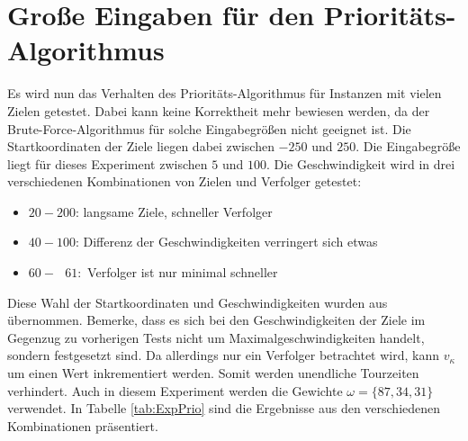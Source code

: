 \documentclass[german,version-2019-11]{uzl-thesis}
\begin{document}
\section{Große Eingaben für den Prioritäts-Algorithmus}
Es wird nun das Verhalten des Prioritäts-Algorithmus für Instanzen mit vielen Zielen getestet. Dabei kann keine Korrektheit mehr bewiesen werden, da der Brute-Force-Algorithmus für solche Eingabegrößen nicht geeignet ist. Die Startkoordinaten der Ziele liegen dabei zwischen $-250$ und $250$. Die Eingabegröße liegt für dieses Experiment zwischen $5$ und $100$. Die Geschwindigkeit wird in drei verschiedenen Kombinationen von Zielen und Verfolger getestet:
\begin{itemize}
\item $20-200$: langsame Ziele, schneller Verfolger
\item $40-100$: Differenz der Geschwindigkeiten verringert sich etwas
\item $60-~~~61$:~Verfolger ist nur minimal schneller
\end{itemize}\noindent
Diese Wahl der Startkoordinaten und Geschwindigkeiten wurden aus \cite{stieber2015multiple} übernommen. Bemerke, dass es sich bei den Geschwindigkeiten der Ziele im Gegenzug zu vorherigen Tests nicht um Maximalgeschwindigkeiten handelt, sondern festgesetzt sind. Da allerdings nur ein Verfolger betrachtet wird, kann $v_{\kappa}$ um einen Wert inkrementiert werden. Somit werden unendliche Tourzeiten verhindert. Auch in diesem Experiment werden die Gewichte $\omega = \{87,34,31\}$ verwendet. In Tabelle \ref{tab:ExpPrio} sind die Ergebnisse aus den verschiedenen Kombinationen präsentiert.
\end{document}
